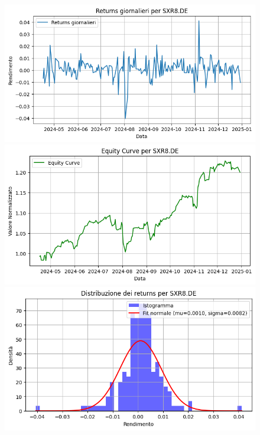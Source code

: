 \documentclass{article}%
\begin{document}
\begin{figure}[htbp]%
\begin{minipage}{0.31\textwidth}%
\includegraphics[width=\linewidth]{immagini_tickers/SXR8.DE_returns_plot.png}%
\end{minipage}%
\begin{minipage}{0.31\textwidth}%
\includegraphics[width=\linewidth]{immagini_tickers/SXR8.DE_equity_curve.png}%
\end{minipage}%
\begin{minipage}{0.31\textwidth}%
\includegraphics[width=\linewidth]{immagini_tickers/SXR8.DE_distribuzione_returns.png}%
\end{minipage}%
\end{figure}
\end{document}
